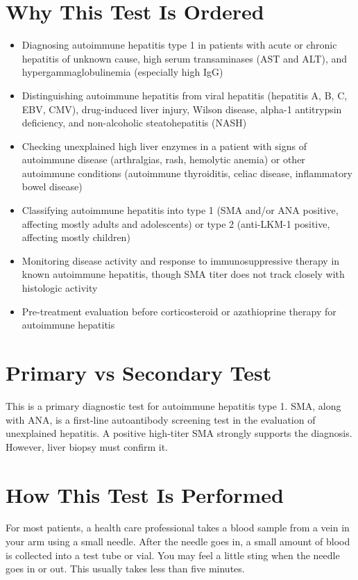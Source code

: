 \section*{Why This Test Is Ordered}
\begin{itemize}
  \item Diagnosing autoimmune hepatitis type 1 in patients with acute or chronic hepatitis of unknown cause, high serum transaminases (AST and ALT), and hypergammaglobulinemia (especially high IgG)
  \item Distinguishing autoimmune hepatitis from viral hepatitis (hepatitis A, B, C, EBV, CMV), drug-induced liver injury, Wilson disease, alpha-1 antitrypsin deficiency, and non-alcoholic steatohepatitis (NASH)
  \item Checking unexplained high liver enzymes in a patient with signs of autoimmune disease (arthralgias, rash, hemolytic anemia) or other autoimmune conditions (autoimmune thyroiditis, celiac disease, inflammatory bowel disease)
  \item Classifying autoimmune hepatitis into type 1 (SMA and/or ANA positive, affecting mostly adults and adolescents) or type 2 (anti-LKM-1 positive, affecting mostly children)
  \item Monitoring disease activity and response to immunosuppressive therapy in known autoimmune hepatitis, though SMA titer does not track closely with histologic activity
  \item Pre-treatment evaluation before corticosteroid or azathioprine therapy for autoimmune hepatitis
\end{itemize}

\section*{Primary vs Secondary Test}
This is a primary diagnostic test for autoimmune hepatitis type 1. SMA, along with ANA, is a first-line autoantibody screening test in the evaluation of unexplained hepatitis. A positive high-titer SMA strongly supports the diagnosis. However, liver biopsy must confirm it.

\section*{How This Test Is Performed}
For most patients, a health care professional takes a blood sample from a vein in your arm using a small needle. After the needle goes in, a small amount of blood is collected into a test tube or vial. You may feel a little sting when the needle goes in or out. This usually takes less than five minutes.

